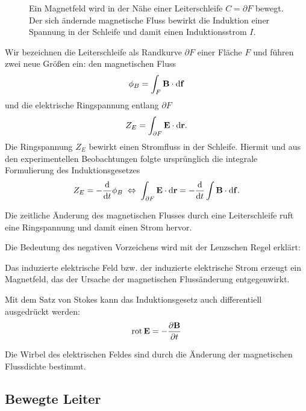 \begin{figure}
	\centering
	\tfigInductionA
	\caption{Ein Magnetfeld wird in der Nähe einer Leiterschleife $C=\partial F$ bewegt. Der sich ändernde magnetische Fluss bewirkt die Induktion einer Spannung in der Schleife und damit einen Induktionsstrom $I$. }
	\label{fig:inductionA}
\end{figure}

Wir bezeichnen die Leiterschleife als Randkurve $\partial F$ einer Fläche $F$ und führen zwei neue Größen ein: den magnetischen Fluss
\begin{equation*}
	\phi _{B}=\int _{F}\mathbf{B}\cdot \mathop{}\!\mathrm{d} \mathbf{f}
\end{equation*}
und die elektrische Ringspannung entlang $\partial F$
\begin{equation*}
	Z_{E}=\int _{\partial F}\mathbf{E}\cdot \mathop{}\!\mathrm{d} \mathbf{r}.
\end{equation*}
Die Ringspannung $Z_{E}$ bewirkt einen Stromfluss in der Schleife. Hiermit und aus den experimentellen Beobachtungen folgte ursprünglich die integrale Formulierung des Induktionsgesetzes
\begin{equation*}
	Z_{E}=-\frac{\mathop{}\!\mathrm{d} }{\mathop{}\!\mathrm{d} t}\phi _{B}\;\Leftrightarrow\; \int _{\partial F}\mathbf{E}\cdot \mathop{}\!\mathrm{d} \mathbf{r}=-\frac{\mathop{}\!\mathrm{d} }{\mathop{}\!\mathrm{d} t}\int \mathbf{B}\cdot \mathop{}\!\mathrm{d} \mathbf{f}.
\end{equation*}

\begin{formal}
	Die zeitliche Änderung des magnetischen Flusses durch eine Leiterschleife ruft eine Ringspannung und damit einen Strom hervor.
\end{formal}
Die Bedeutung des negativen Vorzeichens wird mit der Lenzschen Regel erklärt:
\begin{formal}
	Das induzierte elektrische Feld bzw. der induzierte elektrische Strom erzeugt ein Magnetfeld, das der Ursache der magnetischen Flussänderung entgegenwirkt.
\end{formal}
Mit dem Satz von Stokes kann das Induktionsgesetz auch differentiell ausgedrückt werden:
\begin{equation*}
	\operatorname{rot} \mathbf{E}=-\frac{\partial \mathbf{B}}{\partial t}
\end{equation*}

\begin{formal}
	Die Wirbel des elektrischen Feldes sind durch die Änderung der magnetischen Flussdichte bestimmt.
\end{formal}


\subsection{Bewegte Leiter}

